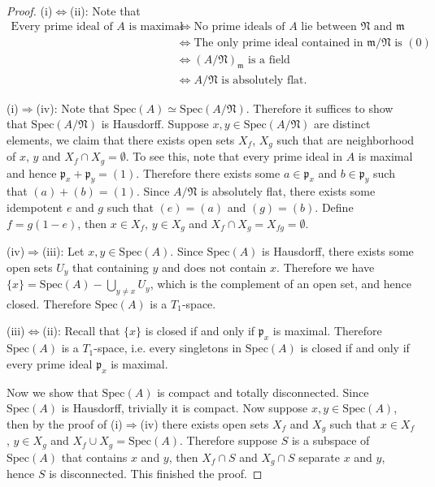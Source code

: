 \begin{proof}
(i)$\iff$(ii): Note that 
$$
\begin{aligned}
\text{Every prime ideal of }A\text{ is maximal}
&\iff
\text{No prime ideals of }A\text{ lie between }\mathfrak{N}\text{ and }\mathfrak{m}\\
&\iff
\text{The only prime ideal contained in }\mathfrak{m}/\mathfrak{N}\text{ is }(0)\\
&\iff
(A/\mathfrak{N})_\mathfrak{m}\text{ is a field}\\
&\iff
A/\mathfrak{N}\text{ is absolutely flat}.
\end{aligned}
$$\par
(i)$\Rightarrow$(iv): Note that $\mathrm{Spec}(A)\simeq\mathrm{Spec}(A/\mathfrak{N})$. Therefore it suffices to show that $\mathrm{Spec}(A/\mathfrak{N})$ is Hausdorff. Suppose $x,y\in\mathrm{Spec}(A/\mathfrak{N})$ are distinct elements, we claim that there exists open sets $X_f$, $X_g$ such that are neighborhood of $x$, $y$ and $X_f\cap X_g=\emptyset$. To see this, note that every prime ideal in $A$ is maximal and hence $\mathfrak{p}_x+\mathfrak{p}_y=(1)$. Therefore there exists some $a\in\mathfrak{p}_x$ and $b\in\mathfrak{p}_y$ such that $(a)+(b)=(1)$. Since $A/\mathfrak{N}$ is absolutely flat, there exists some idempotent $e$ and $g$ such that $(e)=(a)$ and $(g)=(b)$. Define $f=g(1-e)$, then $x\in X_f$, $y\in X_g$ and $X_f\cap X_g=X_{fg}=\emptyset$.\par
(iv)$\Rightarrow$(iii): Let $x,y\in\mathrm{Spec}(A)$. Since $\mathrm{Spec}(A)$ is Hausdorff, there exists some open sets $U_y$ that containing $y$ and does not contain $x$. Therefore we have $\{x\}=\mathrm{Spec}(A)-\bigcup_{y\ne x}U_y$, which is the complement of an open set, and hence closed. Therefore $\mathrm{Spec}(A)$ is a $T_1$-space.\par
(iii)$\iff$(ii): Recall that $\{x\}$ is closed if and only if $\mathfrak{p}_x$ is maximal. Therefore $\mathrm{Spec}(A)$ is a $T_1$-space, i.e. every singletons in $\mathrm{Spec}(A)$ is closed if and only if every prime ideal $\mathfrak{p}_x$ is maximal.\par
Now we show that $\mathrm{Spec}(A)$ is compact and totally disconnected. Since $\mathrm{Spec}(A)$ is Hausdorff, trivially it is compact. Now suppose $x,y\in\mathrm{Spec}(A)$, then by the proof of (i)$\Rightarrow$(iv) there exists open sets $X_f$ and $X_g$ such that $x\in X_f$, $y\in X_g$ and $X_f\cup X_g=\mathrm{Spec}(A)$. Therefore suppose $S$ is a subspace of $\mathrm{Spec}(A)$ that contains $x$ and $y$, then $X_f\cap S$ and $X_g\cap S$ separate $x$ and $y$, hence $S$ is disconnected. This finished the proof.
\end{proof}
